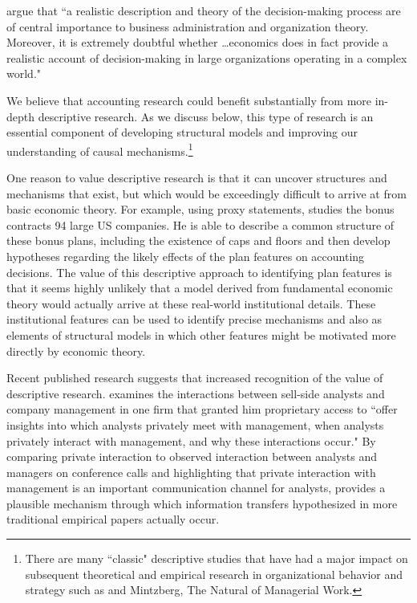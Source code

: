 \documentclass[11pt,reqno]{amsart}
\begin{document}
\begin{doublespace}
\citep{Cyert:1956fd} argue that ``a realistic description and theory of the decision-making process are of central importance to business administration and organization theory. Moreover, it is extremely doubtful whether \dots economics does in fact provide a realistic account of decision-making in large organizations operating in a complex world."

We believe that accounting research could benefit substantially from more in-depth descriptive research.
As we discuss below, this type of research is an essential component of developing structural models and improving our understanding of causal mechanisms.\footnote{
There are many ``classic" descriptive studies that have had a major impact on subsequent theoretical and empirical research in organizational behavior and strategy such as \citep{Cyert:1956fd,Bower:1986vd} and Mintzberg, The Natural of Managerial Work.}

One reason to value descriptive research is that it can uncover structures and mechanisms that exist, but which would be exceedingly difficult to arrive at from basic economic theory.
For example, using proxy statements, \citet{Healy:1985jg} studies the bonus contracts 94 large US companies.
He is able to describe a common structure of these bonus plans, including the existence of caps and floors  \citep[p.\,89]{Healy:1985jg} and then develop hypotheses regarding the likely effects of the plan features on accounting decisions.
The value of this descriptive approach to identifying plan features is that it seems highly unlikely that a model derived from fundamental economic theory would actually arrive at these real-world institutional details.
These institutional features can be used to identify precise mechanisms \citep[as][does]{Healy:1985jg} and also as elements of structural models in which other features might be motivated more directly by economic theory.

Recent published research suggests that increased recognition of the value of descriptive research.
\citet{Soltes:2013ba} examines the interactions between sell-side analysts and company management in one firm that granted him proprietary access to ``offer insights into which analysts privately meet with management, when analysts privately interact with management, and why these interactions occur."  By comparing private interaction to observed interaction between analysts and managers on conference calls and highlighting that private interaction with management is an important communication channel for analysts, \citet{Soltes:2013ba} provides a plausible mechanism through which information transfers hypothesized in more traditional empirical papers actually occur.


\end{doublespace}
\end{document}
